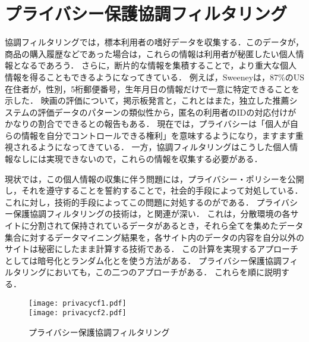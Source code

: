 \chapter{プライバシー保護協調フィルタリング}
\label{chap:privacy}

協調フィルタリングでは，標本利用者の嗜好データを収集する．このデータが，商品の購入履歴などであった場合は，これらの情報は利用者が秘匿したい個人情報となるであろう．
さらに，断片的な情報を集積することで，より重大な個人情報を得ることもできるようになってきている．
例えば，Sweeneyは，87\%のUS在住者が，性別，5桁郵便番号，生年月日の情報だけで一意に特定できることを示した\cite{misc:079}．
映画の評価について，掲示板発言と，これとはまた，独立した推薦システムの評価データのパターンの類似性から，匿名の利用者のIDの対応付けがかなりの割合でできるとの報告もある\cite{sigir:06:05}．
現在では，プライバシーは「個人が自らの情報を自分でコントロールできる権利」\cite{jjsai:06:05}を意味するようになり，ますます重視されるようになってきている．
一方，協調フィルタリングはこうした個人情報なしには実現できないので，これらの情報を収集する必要がある．

現状では，この個人情報の収集に伴う問題には，プライバシー・ポリシーを公開し，それを遵守することを誓約することで，社会的手段によって対処している．
これに対し，技術的手段によってこの問題に対処するのがである．
プライバシー保護協調フィルタリングの技術は，\cite{e:0017,jjsai:09:01}と関連が深い．
これは，分散環境の各サイトに分割されて保持されているデータがあるとき，それら全てを集めたデータ集合に対するデータマイニング結果を，各サイト内のデータの内容を自分以外のサイトは秘密にしたまま計算する技術である．
この計算を実現するアプローチとしては暗号化\cite{lncs:00:04}とランダム化\cite{sigmod:00:03}とを使う方法がある．
プライバシー保護協調フィルタリングにおいても，この二つのアプローチがある．
これらを順に説明する．

\begin{figure}
\centering
{}%
{\texttt{[image: privacycf1.pdf]}}\\\bigskip
{}%
{\texttt{[image: privacycf2.pdf]}}
\caption{プライバシー保護協調フィルタリング}
\label{fig:privacycf}
\end{figure}

